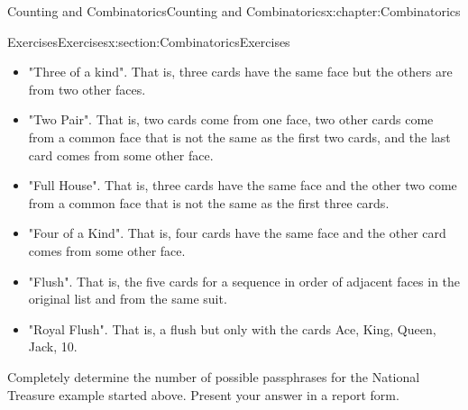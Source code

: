 \documentclass[oneside,10pt,]{book}
\numberwithin{equation}{section}
\begin{document}
\begin{chapterptx}{Counting and Combinatorics}{}{Counting and Combinatorics}{}{}{x:chapter:Combinatorics}
\begin{sectionptx}{Exercises}{}{Exercises}{}{}{x:section:CombinatoricsExercises}
\begin{itemize}[label=\textbullet]
\item{}"Three of a kind".  That is, three cards have the same face but the others are from two other faces.%
\item{}"Two Pair". That is, two cards come from one face, two other cards come from a common face that is not the same as the first two cards, and the last card comes from some other face.%
\item{}"Full House". That is, three cards have the same face and the other two come from a common face that is not the same as the first three cards.%
\item{}"Four of a Kind". That is, four cards have the same face and the other card comes from some other face.%
\item{}"Flush". That is, the five cards for a sequence in order of adjacent faces in the original list and from the same suit.%
\item{}"Royal Flush". That is, a flush but only with the cards \textbraceleft{}Ace, King, Queen, Jack, 10\textbraceright{}.%
\end{itemize}
%
\par
Completely determine the number of possible passphrases for the National Treasure example started above. Present your answer in a report form.%
\end{sectionptx}
\end{chapterptx}
%
%
\typeout{************************************************}
\typeout{************************************************}
%
\end{document}
